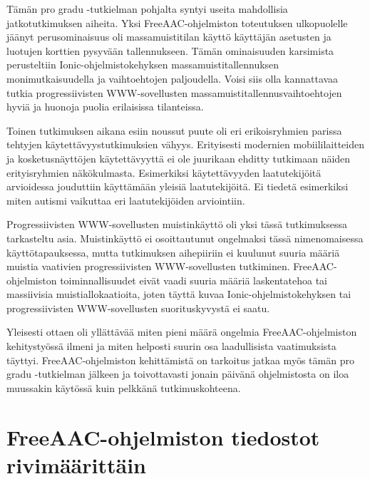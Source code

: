 \documentclass[utf8]{gradu3}
\begin{document}
Tämän pro gradu -tutkielman pohjalta syntyi useita mahdollisia jatkotutkimuksen aiheita. Yksi FreeAAC-ohjelmiston toteutuksen ulkopuolelle jäänyt perusominaisuus oli massamuistitilan käyttö käyttäjän asetusten ja luotujen korttien pysyvään tallennukseen. Tämän ominaisuuden karsimista perusteltiin Ionic-ohjelmistokehyksen massamuistitallennuksen monimutkaisuudella ja vaihtoehtojen paljoudella. Voisi siis olla kannattavaa tutkia progressiivisten WWW-sovellusten massamuistitallennusvaihtoehtojen hyviä ja huonoja puolia erilaisissa tilanteissa.

Toinen tutkimuksen aikana esiin noussut puute oli eri erikoisryhmien parissa tehtyjen käytettävyystutkimuksien vähyys. Erityisesti modernien mobiililaitteiden ja kosketusnäyttöjen käytettävyyttä ei ole juurikaan ehditty tutkimaan näiden erityisryhmien näkökulmasta. Esimerkiksi käytettävyyden laatutekijöitä arvioidessa jouduttiin käyttämään yleisiä laatutekijöitä. Ei tiedetä esimerkiksi miten autismi vaikuttaa eri laatutekijöiden arviointiin.

Progressiivisten WWW-sovellusten muistinkäyttö oli yksi tässä tutkimuksessa tarkasteltu asia. Muistinkäyttö ei osoittautunut ongelmaksi tässä nimenomaisessa käyttötapauksessa, mutta tutkimuksen aihepiiriin ei kuulunut suuria määriä muistia vaativien progressiivisten WWW-sovellusten tutkiminen. FreeAAC-ohjelmiston toiminnallisuudet eivät vaadi suuria määriä laskentatehoa tai massiivisia muistiallokaatioita, joten täyttä kuvaa Ionic\nobreakdash-\hspace{0pt}ohjelmistokehyksen tai progressiivisten WWW-sovellusten suorituskyvystä ei saatu.

Yleisesti ottaen oli yllättävää miten pieni määrä ongelmia FreeAAC-ohjelmiston kehitystyössä ilmeni ja miten helposti suurin osa laadullisista vaatimuksista täyttyi. FreeAAC\nobreakdash-\hspace{0pt}ohjelmiston kehittämistä on tarkoitus jatkaa myös tämän pro gradu -tutkielman jälkeen ja toivottavasti jonain päivänä ohjelmistosta on iloa muussakin käytössä kuin pelkkänä tutkimuskohteena.


\printbibliography

%

\appendix

\section{FreeAAC-ohjelmiston tiedostot rivimäärittäin}
\end{document}
